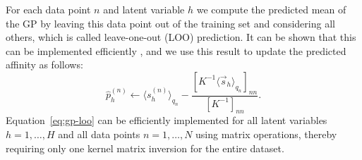 For each data point $n$ and latent variable $h$ we compute the predicted mean of the GP by leaving 
this data point out of the training set and considering all others, which is called leave-one-out (LOO) prediction.
It can be shown that this can be implemented efficiently \citep[see Section 5.4.2 in ][]{RasmussenGPbook}, 
and we use this result to update the predicted affinity as follows:
%
%
\vspace{-.2cm}  %
\begin{equation}\label{eq:gp-loo}
\hat{p}_{h}^{(n)} \leftarrow   
\langle s_h^{(n)}\rangle_{q_n} - \frac{ [ K^{-1} \langle\vec{s}_{h}\rangle_{q_n} ]_{nn} }{ [ K^{-1} ]_{nn} }.
\end{equation}
%
%
Equation~\eqref{eq:gp-loo} can be efficiently implemented for all latent variables $h=1,\dots,H$ and all data points $n=1,\dots,N$ using matrix operations, thereby requiring only one kernel matrix inversion for the entire dataset.
%

%

